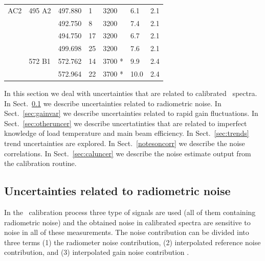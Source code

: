 \begin{table}
\begin{tabular}{|l|l|l|l|l|l|l|}
  \hline
  AC2           & 495 A2               & 497.880                   & 1            & 3200                  & 6.1 & 2.1\\
  \cline{3-3}
  \cline{4-4}
  \cline{5-5}
  \cline{6-6}
  \cline{7-7}
                &                      & 492.750                   & 8            & 3200                  & 7.4 & 2.1\\
  \cline{3-3}
  \cline{4-4}
  \cline{5-5}
  \cline{6-6}
  \cline{7-7}
                &                      & 494.750                   & 17           & 3200                  & 6.7 & 2.1\\
  \cline{3-3}
  \cline{4-4}
  \cline{5-5}
  \cline{6-6}
  \cline{7-7}
                &                      & 499.698                   & 25           & 3200                 & 7.6 & 2.1\\
  \cline{2-2}
  \cline{3-3}
  \cline{4-4}
  \cline{5-5}
  \cline{6-6}
  \cline{7-7}
                & 572 B1              & 572.762                    & 14           & 3700 *              & 9.9 & 2.4\\
  \cline{3-3}
  \cline{4-4}
  \cline{5-5}
  \cline{6-6}
  \cline{7-7}
                &                     & 572.964                    & 22           & 3700 *              & 10.0 & 2.4\\
  \hline
\end{tabular}
\end{table}

In this section we deal with uncertainties that are related to calibrated \smr\ spectra. 
In Sect.~\ref{sec:radnoise} we describe uncertainties related to radiometric noise.
In Sect.~\ref{sec:gainvar} we describe uncertainties related to rapid gain fluctuations.
In Sect.~\ref{sec:otheruncer} we describe uncertatinties that are related to imperfect knowledge
of load temperature and main beam efficiency.
In Sect.~\ref{sec:trends} trend uncertainties are explored.
In Sect.~\ref{notesoncorr} we describe the noise correlations. 
In Sect.~\ref{sec:caluncer} we describe the noise estimate output from the calibration routine.  


\subsection{Uncertainties related to radiometric noise}
\label{sec:radnoise}

In the \smr\ calibration process three type of signals are used (all of them containing radiometric noise)
and the obtained noise in calibrated spectra are sensitive to noise in
all of these measurements. 
The noise contribution can be divided into three terms
(1) the radiometer noise contribution,
(2) interpolated reference noise contribution, and (3) interpolated gain noise contribution
\cite{jarnot:04}.

